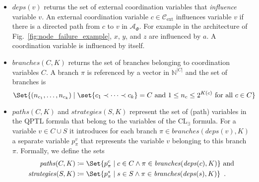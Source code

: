 \documentclass{LMCS}
\newcommand{\deps}{\mathit{deps}}
\newcommand{\branches}{\mathit{branches}}
\newcommand{\paths}{\mathit{paths}}
\newcommand{\strategies}{\mathit{strategies}}
\theoremstyle{plain}\newtheorem{theorem}[thm]{Theorem}
\theoremstyle{plain}\newtheorem{lemma}[thm]{Lemma}
\theoremstyle{plain}\newtheorem{proposition}[thm]{Proposition}
\theoremstyle{plain}\newtheorem{corollary}[thm]{Corollary}
\theoremstyle{definition}\newtheorem{definition}{Definition}[section]
\begin{document}
\begin{itemize}
  \item $\deps(v)$ returns the set of external coordination variables that \emph{influence} variable $v$.
    An external coordination variable $c \in \mathcal{C}_\text{ext}$ influences variable $v$ if there is a directed path from $c$ to $v$ in $\mathcal{A}_\Phi$.
    For example in the architecture of Fig.~\ref{fig:node_failure_example}, $x$, $y$, and $z$ are influenced by $a$.
    A coordination variable is influenced by itself.
  
  \item $\branches(C,K)$ returns the set of branches belonging to coordination variables $C$.
    A branch $\pi$ is referenced by a vector in $\mathbb{N}^{|C|}$ and the set of branches is
    \begin{equation*}
      \Set{ (n_{c_1},\dots,n_{c_k}) \mid \set{c_1 \prec \dots \prec c_k} = C \text{ and } 1 \leq n_c \leq 2^{K(c)} \text{ for all } c \in C }
    \end{equation*}
  
  \item $\paths(C,K)$ and $\strategies(S,K)$ represent the set of (path) variables in the QPTL formula that belong to the variables of the CL$_\exists$ formula.
    For a variable $v \in C \cup S$ it introduces for each branch $\pi \in \branches(\deps(v),K)$ a separate variable $p^v_\pi$ that represents the variable $v$ belonging to this branch $\pi$.
    Formally, we define the sets
      \begin{align*}
        \paths(C,K) &\coloneqq \Set{p^c_\pi \mid c \in C \land \pi \in \branches(\deps(c),K)} \text{ and} \\
        \strategies(S,K) &\coloneqq \Set{p^s_\pi \mid s \in S \land \pi \in \branches(\deps(s),K)} \enspace .
      \end{align*}
  

\end{itemize}
\end{document}
